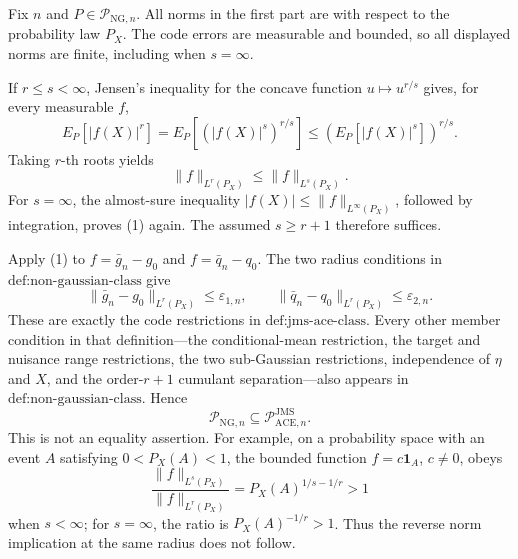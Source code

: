 Fix \(n\) and \(P\in\mathcal P_{\mathrm{NG},n}\).  All norms in the
first part are with respect to the probability law \(P_X\).  The code
errors are measurable and bounded, so all displayed norms are finite,
including when \(s=\infty\).

If \(r\le s<\infty\), Jensen's inequality for the concave function
\(u\mapsto u^{r/s}\) gives, for every measurable \(f\),
\[
 E_P[|f(X)|^r]
 =E_P\!\left[(|f(X)|^s)^{r/s}\right]
 \le\left(E_P[|f(X)|^s]\right)^{r/s}.
\]
Taking \(r\)-th roots yields
\[
 \|f\|_{L^r(P_X)}\le\|f\|_{L^s(P_X)}.                 \tag{1}
\]
For \(s=\infty\), the almost-sure inequality
\(|f(X)|\le\|f\|_{L^\infty(P_X)}\), followed by integration, proves
(1) again.  The assumed \(s\ge r+1\) therefore suffices.

Apply (1) to \(f=\bar g_n-g_0\) and \(f=\bar q_n-q_0\).  The two
radius conditions in \(\text{def:non-gaussian-class}\) give
\[
 \|\bar g_n-g_0\|_{L^r(P_X)}\le\varepsilon_{1,n},
 \qquad
 \|\bar q_n-q_0\|_{L^r(P_X)}\le\varepsilon_{2,n}.       \tag{2}
\]
These are exactly the code restrictions in
\(\text{def:jms-ace-class}\).  Every other member condition in that
definition---the conditional-mean restriction, the target and nuisance
range restrictions, the two sub-Gaussian restrictions, independence of
\(\eta\) and \(X\), and the order-\(r+1\) cumulant separation---also
appears in \(\text{def:non-gaussian-class}\).  Hence
\[
 \mathcal P_{\mathrm{NG},n}
 \subseteq\mathcal P_{\mathrm{ACE},n}^{\mathrm{JMS}}.   \tag{3}
\]
This is not an equality assertion.  For example, on a probability space
with an event \(A\) satisfying \(0<P_X(A)<1\), the bounded function
\(f=c\mathbf 1_A\), \(c\ne0\), obeys
\[
 \frac{\|f\|_{L^s(P_X)}}{\|f\|_{L^r(P_X)}}
 =P_X(A)^{1/s-1/r}>1
\]
when \(s<\infty\); for \(s=\infty\), the ratio is
\(P_X(A)^{-1/r}>1\).  Thus the reverse norm implication at the same
radius does not follow.

